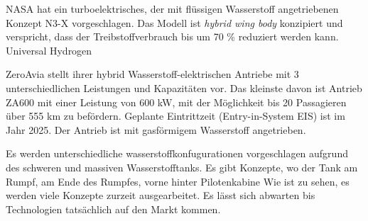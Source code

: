 NASA hat ein turboelektrisches, der mit flüssigen Wasserstoff angetriebenen Konzept N3-X \cite{NASA_N3X_2025} vorgeschlagen.
Das Modell ist \textit{hybrid wing body} konzipiert und verspricht, dass der Treibstoffverbrauch bis um 70 \% reduziert werden kann.
Universal Hydrogen

ZeroAvia stellt ihrer hybrid Wasserstoff-elektrischen Antriebe mit 3 unterschiedlichen Leistungen und Kapazitäten vor. Das kleinste davon
ist Antrieb ZA600 mit einer Leistung von 600 kW, mit der Möglichkeit bis 20 Passagieren über 555 km zu befördern. 
Geplante Eintrittzeit (Entry-in-System EIS) ist im Jahr 2025. Der Antrieb ist mit gasförmigem Wasserstoff angetrieben.




Es werden unterschiedliche wasserstoffkonfugurationen vorgeschlagen aufgrund des schweren und massiven Wasserstofftanks.
Es gibt Konzepte, wo der Tank am Rumpf, am Ende des Rumpfes, vorne hinter Pilotenkabine
Wie ist zu sehen, es werden viele Konzepte zurzeit ausgearbeitet. Es lässt sich abwarten bis Technologien tatsächlich auf den Markt kommen.